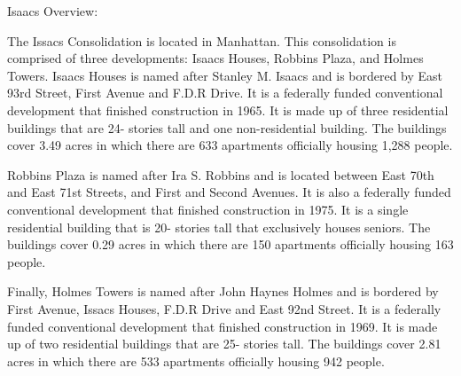 Isaacs Overview:      

    

The Issacs Consolidation is located in Manhattan. This consolidation is comprised of three developments: Isaacs Houses, Robbins Plaza, and Holmes Towers. Isaacs Houses is named after Stanley M. Isaacs and is bordered by East 93rd Street, First Avenue and F.D.R Drive. It is a federally funded conventional development that finished construction in 1965. It is made up of three residential buildings that are 24- stories tall and one non-residential building. The buildings cover 3.49 acres in which there are 633 apartments officially housing 1,288 people.  

Robbins Plaza is named after Ira S. Robbins and is located between East 70th and East 71st Streets, and First and Second Avenues. It is also a federally funded conventional development that finished construction in 1975. It is a single residential building that is 20- stories tall that exclusively houses seniors. The buildings cover 0.29 acres in which there are 150 apartments officially housing 163 people.  

Finally, Holmes Towers is named after John Haynes Holmes and is bordered by First Avenue, Issacs Houses, F.D.R Drive and East 92nd Street. It is a federally funded conventional development that finished construction in 1969. It is made up of two residential buildings that are 25- stories tall. The buildings cover 2.81 acres in which there are 533 apartments officially housing 942 people.  